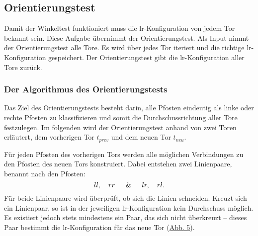 \subsection{Orientierungstest}
Damit der Winkeltest funktioniert muss die lr-Konfiguration von jedem Tor bekannt sein. Diese Aufgabe übernimmt der Orientierungstest. Als Input nimmt der Orientierungstest alle Tore. Es wird über jedes Tor iteriert und die richtige lr-Konfiguration gespeichert. Der Orientierungstest gibt die lr-Konfiguration aller Tore zurück.

\subsubsection{Der Algorithmus des Orientierungstests}
Das Ziel des Orientierungstests besteht darin, alle Pfosten eindeutig als linke oder rechte Pfosten zu klassifizieren und somit die Durchschussrichtung aller Tore festzulegen. Im folgenden wird der Orientierungstest anhand von zwei Toren erläutert, dem vorherigen Tor \(t_{prev}\) und dem neuen Tor \(t_{neu}\).

Für jeden Pfosten des vorherigen Tors werden alle möglichen Verbindungen zu den Pfosten des neuen Tors konstruiert. Dabei entstehen zwei Linienpaare, benannt nach den Pfosten:
\[
ll,\quad rr\quad\And\quad lr,\quad rl.
\]
Für beide Linienpaare wird überprüft, ob sich die Linien schneiden. Kreuzt sich ein Linienpaar, so ist in der jeweiligen lr-Konfiguration kein Durchschuss möglich. Es existiert jedoch stets mindestens ein Paar, das sich nicht überkreuzt – dieses Paar bestimmt die lr-Konfiguration für das neue Tor (\hyperref[fig:orientierungstest]{Abb. 5}).


